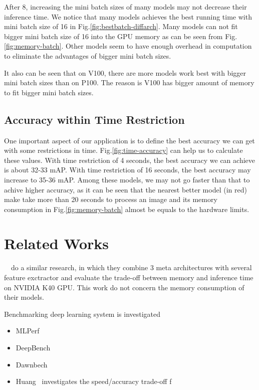 \documentclass[conference]{IEEEtran}
\begin{document}
After 8, increasing the mini batch sizes of many models may not decrease their inference time. We notice that many models achieves the best running time with mini batch size of 16 in Fig.\ref{fig:bestbatch-diffarch}. Many models can not fit bigger mini batch size of 16 into the GPU memory as can be seen from Fig.\ref{fig:memory-batch}. Other models seem to have enough overhead in computation to eliminate the advantages of bigger mini batch sizes.

It also can be seen that on V100, there are more models work best with bigger mini batch sizes than on P100. The reason is V100 has bigger amount of memory to fit bigger mini batch sizes.

\subsection{Accuracy within Time Restriction}
One important aspect of our application is to define the best accuracy we can get with some restrictions in time. Fig.\ref{fig:time-accuracy} can help us to calculate these values. With time restriction of 4 seconds, the best accuracy we can achieve is about 32-33 mAP. With time restriction of 16 seconds, the best accuracy may increase to 35-36 mAP. Among these models, we may not go faster than that to achive higher accuracy, as it can be seen that the nearest better model (in red) make take more than 20 seconds to process an image and its memory consumption in Fig.\ref{fig:memory-batch} almost be equals to the hardware limits.



\section{Related Works}
~\cite{huang2017speed}~do a similar research, in which they combine 3 meta architectures with several feature exctractor and evaluate the trade-off between memory and inference time on NVIDIA K40 GPU. This work do not concern the memory consumption of their models.

Benchmarking deep learning system is investigated

\begin{itemize}
    \item MLPerf
    \item DeepBench
    \item Dawnbech
    \item Huang~\cite{DBLP:journals/corr/HuangRSZKFFWSG016} investigates the speed/accuracy trade-off f
\end{itemize}
\end{document}
